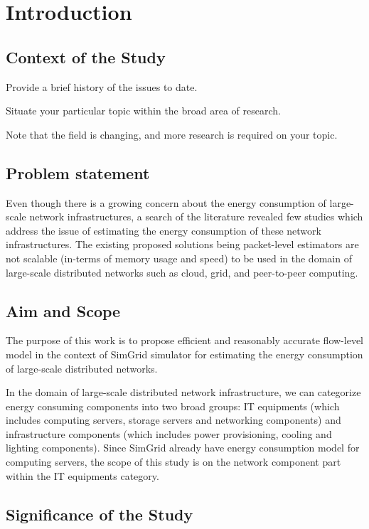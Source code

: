 \chapter{Introduction}
\label{chapter:intro}

\section{Context of the Study}	 
Provide a brief history of the issues to date.

Situate your particular topic within the broad area of research.

Note that the field is changing, and more research is required on your topic.
\section{Problem statement}
Even though there is a growing concern about the energy consumption of large-scale network infrastructures, a search of the literature revealed few studies which address the issue of estimating the energy consumption of these network infrastructures. The existing proposed solutions being packet-level estimators are not scalable (in-terms of memory usage and speed) to be used in the domain of large-scale distributed networks such as cloud, grid, and peer-to-peer computing. 

\section{Aim and Scope}

The purpose of this work is to propose efficient and reasonably accurate flow-level model in the context of SimGrid simulator for estimating the energy consumption of large-scale distributed networks. 

In the domain of large-scale distributed network infrastructure, we can categorize energy consuming components into two broad groups: IT equipments (which includes computing servers, storage servers and networking components) and infrastructure components (which includes power provisioning, cooling and lighting components). Since SimGrid already have energy consumption model for computing servers, the scope of this study is on the network component part within the IT equipments category.

\section{Significance of the Study}

